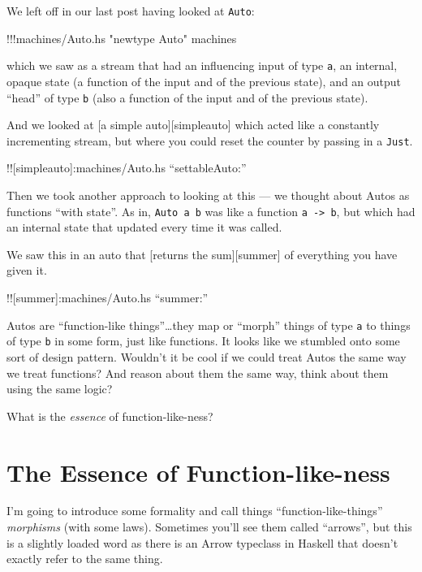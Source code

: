 \documentclass[]{article}
\newenvironment{Shaded}{}{}
\newcommand{\StringTok}[1]{\textcolor[rgb]{0.25,0.44,0.63}{{#1}}}
\newcommand{\FunctionTok}[1]{\textcolor[rgb]{0.02,0.16,0.49}{{#1}}}
\newcommand{\NormalTok}[1]{{#1}}
\begin{document}
We left off in our last post having looked at \texttt{Auto}:

\begin{Shaded}
\begin{Highlighting}[]
\FunctionTok{!!!}\NormalTok{machines}\FunctionTok{/}\NormalTok{Auto.hs }\StringTok{"newtype Auto"} \NormalTok{machines}
\end{Highlighting}
\end{Shaded}

which we saw as a stream that had an influencing input of type
\texttt{a}, an internal, opaque state (a function of the input and of
the previous state), and an output ``head'' of type \texttt{b} (also a
function of the input and of the previous state).

And we looked at {[}a simple auto{]}{[}simpleauto{]} which acted like a
constantly incrementing stream, but where you could reset the counter by
passing in a \texttt{Just}.

!!{[}simpleauto{]}:machines/Auto.hs ``settableAuto:''

Then we took another approach to looking at this --- we thought about
Autos as functions ``with state''. As in, \texttt{Auto\ a\ b} was like a
function \texttt{a\ -\textgreater{}\ b}, but which had an internal state
that updated every time it was called.

We saw this in an auto that {[}returns the sum{]}{[}summer{]} of
everything you have given it.

!!{[}summer{]}:machines/Auto.hs ``summer:''

Autos are ``function-like things''\ldots{}they map or ``morph'' things
of type \texttt{a} to things of type \texttt{b} in some form, just like
functions. It looks like we stumbled onto some sort of design pattern.
Wouldn't it be cool if we could treat Autos the same way we treat
functions? And reason about them the same way, think about them using
the same logic?

What is the \emph{essence} of function-like-ness?

\section{The Essence of
Function-like-ness}\label{the-essence-of-function-like-ness}

I'm going to introduce some formality and call things
``function-like-things'' \emph{morphisms} (with some laws). Sometimes
you'll see them called ``arrows'', but this is a slightly loaded word as
there is an Arrow typeclass in Haskell that doesn't exactly refer to the
same thing.
\end{document}
